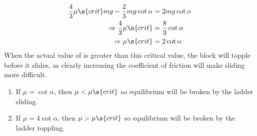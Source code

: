 \begin{problem}[A1987FMIIQ1l]
{\begin{enumerate}
 \begin{align*}
\frac{4}{3}\mu\s{crit} mg - \frac{2}{3}mg\cot{\alpha}&= 2mg\cot{\alpha} \\
\Rightarrow \frac{4}{3}\mu\s{crit}&= \frac{8}{3}\cot{\alpha} \\
\Rightarrow \mu\s{crit}&= 2\cot{\alpha}
 \end{align*}
 When the actual value of \vari{\mu} is greater than this critical value, the block will topple before it slides, as clearly increasing the coefficient of friction will make sliding more difficult. 
 	\begin{enumerate}
 		\item If $\mu = \cot{\alpha}$, then $\mu < \mu\s{crit}$ so equilibrium will be broken by the ladder sliding.
		\item If $\mu = 4\cot{\alpha}$, then $\mu > \mu\s{crit}$ so equilibrium will be broken by the ladder toppling.
	\end{enumerate}
\end{enumerate}
}
\end{problem}